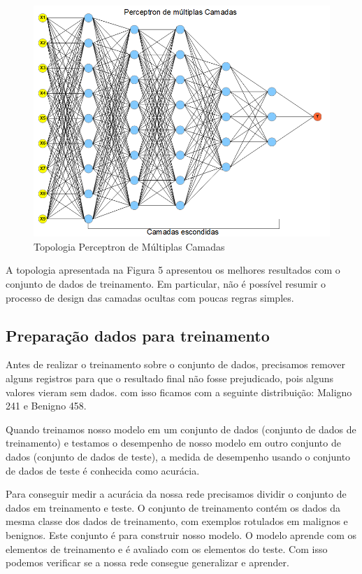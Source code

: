 \documentclass[conference]{IEEEtran}
\begin{document}
        \begin{figure}[htbp]
	\centerline{\includegraphics[scale=0.4]{Perceptron-MLP.png}}
	\caption{Topologia Perceptron de Múltiplas Camadas}
	
	\label{fig}
	\end{figure}
    
    A topologia apresentada na Figura 5 apresentou os melhores resultados com o conjunto de dados de treinamento. Em particular, não é possível resumir o processo de design das camadas ocultas com poucas regras simples. 
    
    \subsection{Preparação dados para treinamento}
    
    Antes de realizar o treinamento sobre o conjunto de dados, precisamos remover alguns registros para que o resultado final não fosse prejudicado, pois alguns valores vieram sem dados. com isso ficamos com a seguinte distribuição: Maligno 241 e Benigno 458.
    
    Quando treinamos nosso modelo em um conjunto de dados (conjunto de dados de treinamento) e testamos o desempenho de nosso modelo em outro conjunto de dados (conjunto de dados de teste), a medida de desempenho usando o conjunto de dados de teste é conhecida como acurácia. 
    
    Para conseguir medir a acurácia da nossa rede precisamos dividir o conjunto de dados em treinamento e teste. O conjunto de treinamento contém os dados da mesma classe dos dados de treinamento, com exemplos rotulados em malignos e benignos. Este conjunto é para construir nosso modelo. O modelo aprende com os elementos de treinamento e é avaliado com os elementos do teste. Com isso podemos verificar se a nossa rede consegue generalizar e aprender.
    
\end{document}
